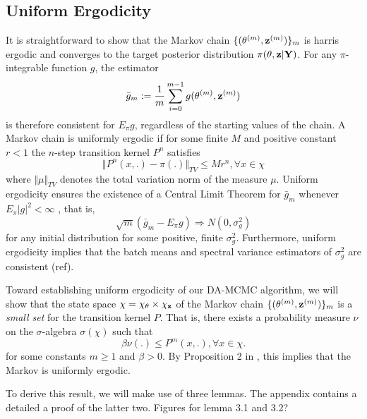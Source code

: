\documentclass[11pt]{article}
\begin{document}
	\subsection{Uniform Ergodicity}
	
	It is straightforward to show that the Markov chain $\{(\theta^{(m)}, \mathbf{z}^{(m)})\}_m$ is harris ergodic and converges to the target posterior distribution $\pi(\theta, \mathbf{z}|\mathbf{Y})$. For any $\pi$-integrable function $g$, the estimator
	$$\bar{g}_m := \frac{1}{m} \sum_{i=0}^{m-1} g(\theta^{(m)}, \mathbf{z}^{(m)})$$
	is therefore consistent for $E_\pi g$, regardless of the starting values of the chain. A Markov chain is uniformly ergodic if for some finite $M$ and positive constant $r<1$ the $n$-step transition kernel $P^n$ satisfies
	$$
	\Vert P^n(x,.)-\pi(.)\Vert_{TV} \le M r^n, \forall x \in \chi
	$$
	where $\Vert \mu \Vert_{TV}$ denotes the total variation norm of the measure $\mu$.
	Uniform ergodicity ensures the existence of a Central Limit Theorem for $\bar{g}_m$ whenever $E_\pi |g|^2 < \infty$ \cite{Jones.2004}, that is,
	$$\sqrt{m}(\bar{g}_m - E_\pi g) \Rightarrow N(0, \sigma^2_g)$$
	for any initial distribution for some positive, finite $\sigma^2_g$. Furthermore, uniform ergodicity implies that the batch means and spectral variance estimators of $\sigma^2_g$ are consistent (ref).
	
	
	
	Toward establishing uniform ergodicity of our DA-MCMC algorithm, we will show that the state space $\chi = \chi_{\theta}\times\chi_{\mathbf{z}}$ of the Markov chain $\{(\theta^{(m)}, \mathbf{z}^{(m)})\}_m$ is a \textit{small set} for the transition kernel $P$. That is, there exists a probability measure $\nu$ on the $\sigma$-algebra $\sigma(\chi)$ such that
	$$\beta \nu(.) \le P^m(x,.), \forall x\in \chi.$$
	for some constants $m \ge 1$ and $\beta > 0$.
	By Proposition 2 in \cite{Tierney.1994}, this implies that the Markov is uniformly ergodic. 
	
	To derive this result, we will make use of three lemmas. The appendix contains a detailed a proof of the latter two.
	\rm{Figures for lemma 3.1 and 3.2?}
	
\end{document}
